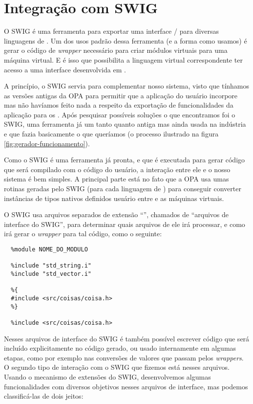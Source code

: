   \section{Integração com SWIG}
  \label{sec:actividads:integracaoswig}
  O SWIG é uma ferramenta para exportar uma interface \C{}/\CXX{} para diversas 
  linguagens de \script{}. Um dos usos padrão dessa ferramenta (e 
  a forma como usamos) é gerar o código de \textit{wrapper} necessário para criar 
  módulos virtuais para uma máquina virtual.
  E é isso que possibilita a linguagem virtual correspondente ter acesso a uma
  interface desenvolvida em \CXX{}.
  
  A princípio, o SWIG servia para complementar nosso sistema, visto que tínhamos
  as versões antigas da OPA para permitir que a aplicação
  do usuário incorpore  mas não havíamos feito nada a respeito da exportação
  de funcionalidades da aplicação para os . Após pesquisar possíveis soluções
  o que encontramos foi o SWIG, uma ferramenta já um tanto quanto antiga mas ainda usada
  na indústria e que fazia basicamente o que queríamos (o processo ilustrado na figura
  \ref{fig:gerador-funcionamento}).
  
  Como o SWIG é uma ferramenta já pronta, e que é executada para gerar código que será compilado
  com o código do usuário, a interação entre ele e o nosso sistema é bem simples. A principal
  parte está no fato que a OPA usa umas rotinas geradas pelo SWIG (para cada linguagem de
  \script{}) para conseguir converter instâncias de tipos nativos definidos usuário entre
  \CXX{} e as máquinas virtuais.
  
  O SWIG usa arquivos separados de extensão ``'', chamados de ``arquivos de interface do 
  SWIG'', para determinar quais arquivos de \CXX{} ele irá processar, e como irá gerar o 
  \textit{wrapper} para tal código, como o seguinte:
  \vspace{1em}
  \begin{lstlisting}
  %module NOME_DO_MODULO

  %include "std_string.i"
  %include "std_vector.i"
  
  %{
  #include <src/coisas/coisa.h>
  %}

  %include <src/coisas/coisa.h>
  \end{lstlisting}
  \vspace{1em}
  
  Nesses arquivos de interface do SWIG é também possível escrever código que será incluído
  explicitamente no código gerado, ou usado internamente em algumas etapas, como por exemplo
  nas conversões de valores que passam pelos \textit{wrappers}. O segundo tipo de interação
  com o SWIG que fizemos está nesses arquivos. Usando o mecanismo de extensões do SWIG,
  desenvolvemos algumas funcionalidades com diversos objetivos nesses arquivos de interface,
  mas podemos classificá-las de dois jeitos:

